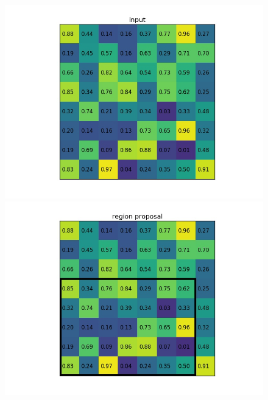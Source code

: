 \documentclass{article}
\begin{document}
\begin{figure}[htbp]
    \centering
    \begin{minipage}{0.5\textwidth}
        \centering
        \includegraphics[width=1.1\textwidth]{roipool1.jpg} %
    \end{minipage}\hfill
    \begin{minipage}{0.5\textwidth}
        \centering
        \includegraphics[width=1.1\textwidth]{roipool2.jpg} %
    \end{minipage}
\end{figure}
\end{document}
